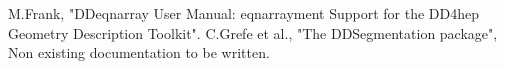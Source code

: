 \documentclass[10pt,a4paper]{article}
\begin{document}
\newpage
\begin{thebibliography}{9}

 M.Frank,
                   "DDeqnarray User Manual: 
                   eqnarrayment Support for the DD4hep Geometry Description Toolkit".
 C.Grefe et al.,
                   "The DDSegmentation package", 
                   Non existing documentation to be written.
\end{thebibliography}
\end{document}

